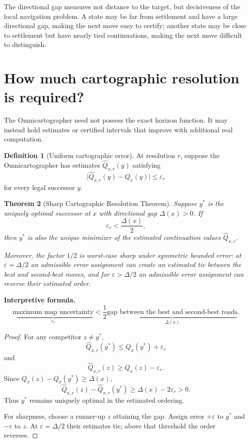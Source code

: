\documentclass[11pt]{article}
\newtheorem{theorem}{Theorem}[section]
\theoremstyle{definition}
\newtheorem{definition}[theorem]{Definition}
\theoremstyle{remark}
\newcommand{\Qval}{Q}
\newcommand{\Gap}{\Delta}
\newcommand{\eps}{\varepsilon}
\newenvironment{interpretiveformula}{%
  \begin{center}\begin{minipage}{0.92\textwidth}\small
  \textbf{Interpretive formula.}\ }{\end{minipage}\end{center}}
\begin{document}
The directional gap measures not distance to the target, but decisiveness of the local navigation problem. A state may be far from settlement and have a large directional gap, making the next move easy to certify; another state may be close to settlement but have nearly tied continuations, making the next move difficult to distinguish.

\section{How much cartographic resolution is required?}
The Omnicartographer need not possess the exact horizon function. It may instead hold estimates or certified intervals that improve with additional real computation.

\begin{definition}[Uniform cartographic error]
At resolution $r$, suppose the Omnicartographer has estimates $\widehat{\Qval}_{x,r}(y)$ satisfying
\[
\bigl|\widehat{\Qval}_{x,r}(y)-\Qval_x(y)\bigr|\le \eps_r
\]
for every legal successor $y$.
\end{definition}

\begin{theorem}[Sharp Cartographic Resolution Theorem]\label{thm:half-gap}
Suppose $y^*$ is the uniquely optimal successor at $x$ with directional gap $\Gap(x)>0$. If
\[
\boxed{\eps_r<\frac{\Gap(x)}{2}},
\]
then $y^*$ is also the unique minimizer of the estimated continuation values $\widehat{\Qval}_{x,r}$.

Moreover, the factor $1/2$ is worst-case sharp under symmetric bounded error: at $\eps=\Gap/2$ an admissible error assignment can create an estimated tie between the best and second-best moves, and for $\eps>\Gap/2$ an admissible error assignment can reverse their estimated order.
\end{theorem}

\begin{interpretiveformula}
\[
\underbrace{\text{maximum map uncertainty}}_{\eps_r}
<
\frac12\underbrace{\text{gap between the best and second-best roads}}_{\Gap(x)}.
\]
\end{interpretiveformula}

\begin{proof}
For any competitor $z\neq y^*$,
\[
\widehat{\Qval}_{x,r}(y^*)\le \Qval_x(y^*)+\eps_r
\]
and
\[
\widehat{\Qval}_{x,r}(z)\ge \Qval_x(z)-\eps_r.
\]
Since $\Qval_x(z)-\Qval_x(y^*)\ge\Gap(x)$,
\[
\widehat{\Qval}_{x,r}(z)-\widehat{\Qval}_{x,r}(y^*)
\ge \Gap(x)-2\eps_r>0.
\]
Thus $y^*$ remains uniquely optimal in the estimated ordering.

For sharpness, choose a runner-up $z$ attaining the gap. Assign error $+\eps$ to $y^*$ and $-\eps$ to $z$. At $\eps=\Gap/2$ their estimates tie; above that threshold the order reverses.
\end{proof}
\end{document}

